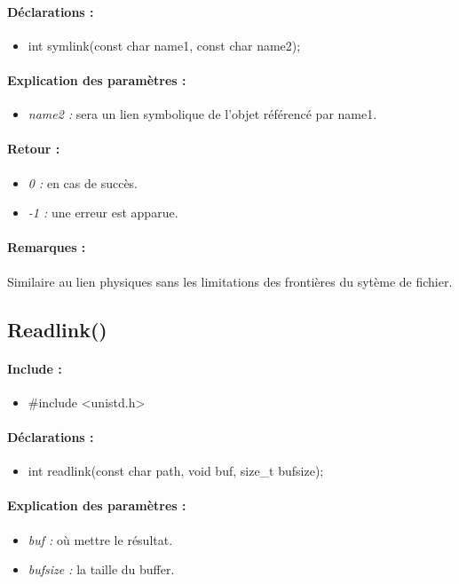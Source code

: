 \documentclass{article}[12pt]
\begin{document}
\paragraph{Déclarations : }
\begin{itemize}
	\item int symlink(const char \* name1, const char \* name2);
\end{itemize}
\paragraph{Explication des paramètres : }
\begin{itemize}
	\item \emph{name2 : } sera un lien symbolique de l'objet référencé par name1.
\end{itemize}
\paragraph{Retour : }
\begin{itemize}
	\item \emph{0 : } en cas de succès.
	\item \emph{-1 : } une erreur est apparue.
\end{itemize}
\paragraph{Remarques : }
Similaire au lien physiques sans les limitations des frontières du sytème de fichier.
\subsection{Readlink()}
\paragraph{Include : }
\begin{itemize}
	\item \#include <unistd.h>
\end{itemize}
\paragraph{Déclarations : }
\begin{itemize}
	\item int readlink(const char \* path, void \* buf, size\_t bufsize);
\end{itemize}
\paragraph{Explication des paramètres : }
\begin{itemize}
	\item \emph{buf : } où mettre le résultat.
	\item \emph{bufsize : } la taille du buffer.
\end{itemize}
\end{document}
